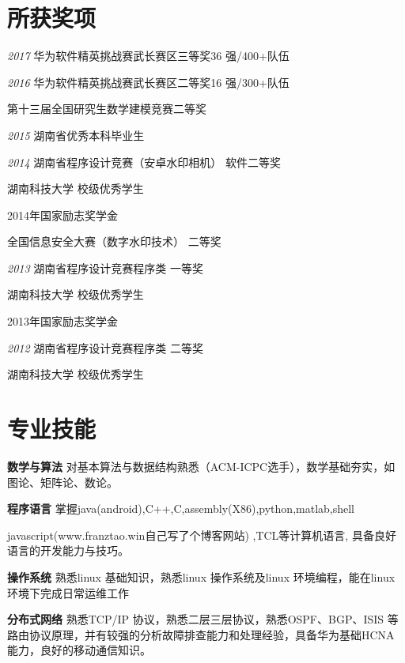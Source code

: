 \documentclass[letterpaper,11pt]{article}
\begin{document}
\section{所获奖项}
\begin{CV}
\item[\it 2017]
华为软件精英挑战赛武长赛区三等奖36 强/400+队伍
\item[\it 2016]
华为软件精英挑战赛武长赛区二等奖16 强/300+队伍

第十三届全国研究生数学建模竞赛二等奖
\item[\it 2015]
湖南省优秀本科毕业生
\item[\it 2014]
湖南省程序设计竞赛（安卓水印相机） 软件二等奖

湖南科技大学 校级优秀学生

2014年国家励志奖学金

全国信息安全大赛（数字水印技术） 二等奖
\item[\it 2013]
湖南省程序设计竞赛程序类 一等奖

湖南科技大学 校级优秀学生

2013年国家励志奖学金
\item[\it 2012]
湖南省程序设计竞赛程序类 二等奖

湖南科技大学 校级优秀学生

\end{CV}


\section{专业技能}


\begin{CV}

\item[\bf 数学与算法] 对基本算法与数据结构熟悉（ACM-ICPC选手），数学基础夯实，如图论、矩阵论、数论。

\item[\bf 程序语言] 掌握java(android),C++,C,assembly(X86),python,matlab,shell

    javascript(www.franztao.win自己写了个博客网站)
,TCL等计算机语言, 具备良好语言的开发能力与技巧。

\item[\bf 操作系统] 熟悉linux 基础知识，熟悉linux 操作系统及linux 环境编程，能在linux 环境下完成日常运维工作

\item [\bf 分布式网络] 熟悉TCP/IP 协议，熟悉二层三层协议，熟悉OSPF、BGP、ISIS 等路由协议原理，并有较强的分析故障排查能力和处理经验，具备华为基础HCNA 能力，良好的移动通信知识。
\end{CV}
\end{document}
